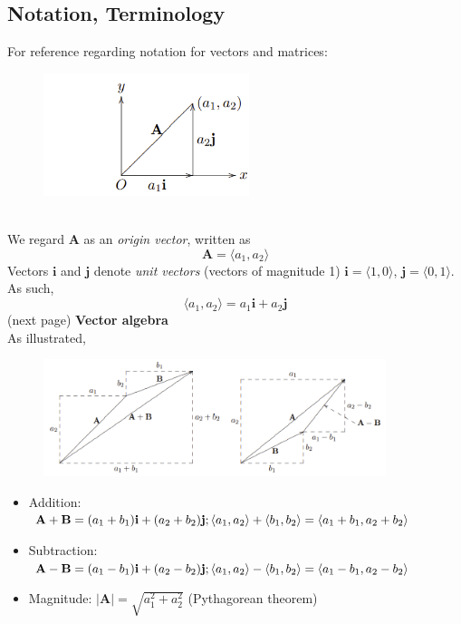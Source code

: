 \documentclass{report}
\begin{document}
\subsection{Notation, Terminology}
For reference regarding notation for vectors and matrices:
\begin{figure}[h]
\includegraphics[width=6cm]{Capture63}\\
\centering
\end{figure}\\
We regard $\mathbf{A}$ as an \textit{origin vector}, written as
\begin{equation*}
\mathbf{A}=\langle a_1,a_2\rangle
\end{equation*}
Vectors $\mathbf{i}$ and $\mathbf{j}$ denote \textit{unit vectors} (vectors of magnitude 1) $\mathbf{i}=
\langle 1,0\rangle$, $\mathbf{j}=\langle 0,1\rangle$.
As such,
\begin{equation*}
\langle a_1,a_2\rangle=a_1\mathbf{i}+a_2\mathbf{j}
\end{equation*}
(next page)
\newpage
\noindent\textbf{Vector algebra}\\
As illustrated,
\begin{figure}[h]
\includegraphics[width=10cm]{Capture64}\\
\centering
\end{figure}
\begin{itemize}
\item Addition: $\mathbf{A+B}=(a_1+b_1)\mathbf{i}+(a_2+b_2)\mathbf{j};\\
\langle a_1,a_2\rangle+\langle b_1,b_2\rangle=
\langle a_1+b_1,a_2+b_2\rangle$
\item Subtraction: $\mathbf{A-B}=(a_1-b_1)\mathbf{i}+(a_2-b_2)\mathbf{j};\\
\langle a_1,a_2\rangle-\langle b_1,b_2\rangle=
\langle a_1-b_1,a_2-b_2\rangle$
\item Magnitude: $\mathbf{|A|}=\sqrt{a_1^2+a_2^2}$ (Pythagorean theorem)
\end{itemize}
\end{document}
